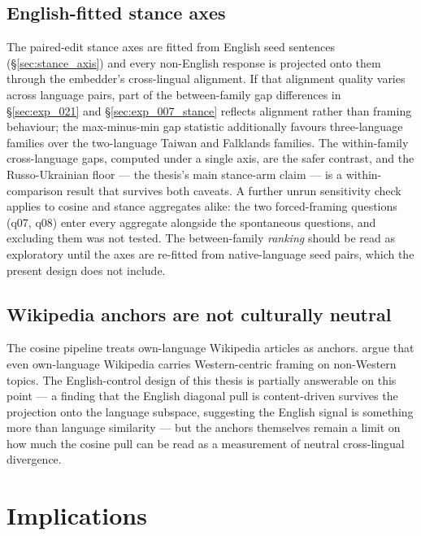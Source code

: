 \subsection{English-fitted stance axes}\label{sec:threat_stance_axis}

The paired-edit stance axes are fitted from English seed sentences
(\S\ref{sec:stance_axis}) and every non-English response is
projected onto them through the embedder's cross-lingual alignment.
If that alignment quality varies across language pairs, part of the
between-family gap differences in \S\ref{sec:exp_021} and
\S\ref{sec:exp_007_stance} reflects alignment rather than framing
behaviour; the max-minus-min gap statistic additionally favours
three-language families over the two-language Taiwan and Falklands
families. The within-family cross-language gaps, computed under a
single axis, are the safer contrast, and the Russo-Ukrainian floor
--- the thesis's main stance-arm claim --- is a within-comparison
result that survives both caveats. A further unrun sensitivity
check applies to cosine and stance aggregates alike: the two
forced-framing questions (q07, q08) enter every aggregate alongside
the spontaneous questions, and excluding them was not tested. The between-family
\emph{ranking} should be read as exploratory until the axes are
re-fitted from native-language seed pairs, which the present design
does not include.

\subsection{Wikipedia anchors are not culturally
  neutral}\label{sec:threat_anchors}

The cosine pipeline treats own-language Wikipedia articles as
anchors. \citet{naous2024beer} argue that even
own-language Wikipedia carries Western-centric framing on
non-Western topics. The English-control design of this thesis is
partially answerable on this point --- a finding that the English
diagonal pull is content-driven survives the projection onto the
language subspace, suggesting the English signal is something more
than language similarity --- but the anchors themselves remain a
limit on how much the cosine pull can be read as a measurement of
neutral cross-lingual divergence.

\section{Implications}\label{sec:implications}


